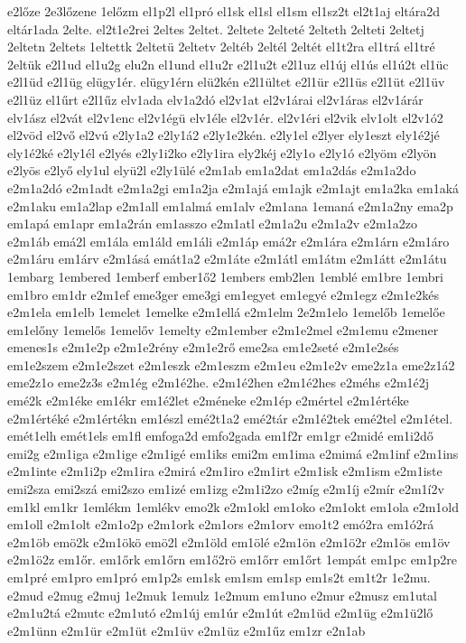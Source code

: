 {e2lőze
2e3lőzene
1előzm
el1p2l
el1pró
el1sk
el1sl
el1sm
el1sz2t
el2t1aj
eltára2d
eltár1ada
2elte.
el2t1e2rei
2eltes
2eltet.
2eltete
2elteté
2elteth
2elteti
2eltetj
2eltetn
2eltets
1eltettk
2eltetü
2eltetv
2eltéb
2eltél
2eltét
el1t2ra
el1trá
el1tré
2eltük
e2l1ud
el1u2g
elu2n
el1und
el1u2r
e2l1u2t
e2l1uz
el1új
el1ús
el1ú2t
el1üc
e2l1üd
e2l1üg
elügy1ér.
elügy1érn
elü2kén
e2l1ültet
e2l1ür
e2l1üs
e2l1üt
e2l1üv
e2l1üz
el1űrt
e2l1űz
elv1ada
elv1a2dó
el2v1at
el2v1árai
el2v1áras
el2v1árár
elv1ász
el2vát
el2v1enc
el2v1égü
elv1éle
el2v1ér.
el2v1éri
el2vik
elv1olt
el2v1ó2
el2vöd
el2vő
el2vú
e2ly1a2
e2ly1á2
e2ly1e2kén.
e2ly1el
e2lyer
ely1eszt
ely1é2jé
ely1é2ké
e2ly1él
e2lyés
e2ly1i2ko
e2ly1ira
ely2kéj
e2ly1o
e2ly1ó
e2lyöm
e2lyön
e2lyös
e2lyő
ely1ul
elyü2l
e2ly1ülé
e2m1ab
em1a2dat
em1a2dás
e2m1a2do
e2m1a2dó
e2m1adt
e2m1a2gi
em1a2ja
e2m1ajá
em1ajk
e2m1ajt
em1a2ka
em1aká
e2m1aku
em1a2lap
e2m1all
em1almá
em1alv
e2m1ana
1emaná
e2m1a2ny
ema2p
em1apá
em1apr
em1a2rán
em1asszo
e2m1atl
e2m1a2u
e2m1a2v
e2m1a2zo
e2m1áb
emá2l
em1ála
em1áld
em1áli
e2m1áp
emá2r
e2m1ára
e2m1árn
e2m1áro
e2m1áru
em1árv
e2m1ásá
emát1a2
e2m1áte
e2m1átl
em1átm
e2m1átt
e2m1átu
1embarg
1embered
1emberf
ember1ő2
1embers
emb2len
1emblé
em1bre
1embri
em1bro
em1dr
e2m1ef
eme3ger
eme3gi
em1egyet
em1egyé
e2m1egz
e2m1e2kés
e2m1ela
em1elb
1emelet
1emelke
e2m1ellá
e2m1elm
2e2m1elo
1emelőb
1emelőe
em1előny
1emelős
1emelőv
1emelty
e2m1ember
e2m1e2mel
e2m1emu
e2mener
emenes1s
e2m1e2p
e2m1e2rény
e2m1e2rő
eme2sa
em1e2seté
e2m1e2sés
em1e2szem
e2m1e2szet
e2m1eszk
e2m1eszm
e2m1eu
e2m1e2v
eme2z1a
eme2z1á2
eme2z1o
eme2z3s
e2m1ég
e2m1é2he.
e2m1é2hen
e2m1é2hes
e2méhs
e2m1é2j
emé2k
e2m1éke
em1ékr
em1é2let
e2méneke
e2m1ép
e2mértel
e2m1értéke
e2m1értéké
e2m1értékn
em1észl
emé2t1a2
emé2tár
e2m1é2tek
emé2tel
e2m1étel.
emét1elh
emét1els
em1fl
emfoga2d
emfo2gada
em1f2r
em1gr
e2midé
em1i2dő
emi2g
e2m1iga
e2m1ige
e2m1igé
em1iks
emi2m
em1ima
e2mimá
e2m1inf
e2m1ins
e2m1inte
e2m1i2p
e2m1ira
e2mirá
e2m1iro
e2m1irt
e2m1isk
e2m1ism
e2m1iste
emi2sza
emi2szá
emi2szo
em1izé
em1izg
e2m1i2zo
e2míg
e2m1íj
e2mír
e2m1í2v
em1kl
em1kr
1emlékm
1emlékv
emo2k
e2m1okl
em1oko
e2m1okt
em1ola
e2m1old
em1oll
e2m1olt
e2m1o2p
e2m1ork
e2m1ors
e2m1orv
emo1t2
emó2ra
em1ó2rá
e2m1öb
emö2k
e2m1ökö
emö2l
e2m1öld
em1ölé
e2m1ön
e2m1ö2r
e2m1ös
em1öv
e2m1ö2z
em1őr.
em1őrk
em1őrn
em1ő2rö
em1őrr
em1őrt
1empát
em1pc
em1p2re
em1pré
em1pro
em1pró
em1p2s
em1sk
em1sm
em1sp
em1s2t
em1t2r
1e2mu.
e2mud
e2mug
e2muj
1e2muk
1emulz
1e2mum
em1uno
e2mur
e2musz
em1utal
e2m1u2tá
e2mutc
e2m1utó
e2m1új
em1úr
e2m1út
e2m1üd
e2m1üg
e2m1ü2lő
e2m1ünn
e2m1ür
e2m1üt
e2m1üv
e2m1üz
e2m1űz
em1zr
e2n1ab
}
